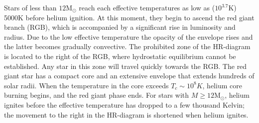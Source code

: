 Stars of less than $12$M$_{\odot}$ reach each effective temperatures as low as ($10^{3.7}$K) 5000K before helium ignition. At this moment, they begin to ascend the red giant branch (RGB), which is accompanied by a significant rise in luminosity and radius. Due to the low effective temperature the opacity of the envelope rises and the latter becomes gradually convective. The prohibited zone of the HR-diagram is located to the right of the RGB, where hydrostatic equilibrium cannot be established. Any star in this zone will travel quickly towards the RGB. The red giant star has a compact core and an extensive envelope that extends hundreds of solar radii. When the temperature in the core exceeds $T_c \sim 10^8 K$, helium core burning begins, and the red giant phase ends. For stars with $M \geq 12$M$_{\odot}$, helium ignites before the effective temperature has dropped to a few thousand Kelvin; the movement to the right in the HR-diagram is shortened when helium ignites.

